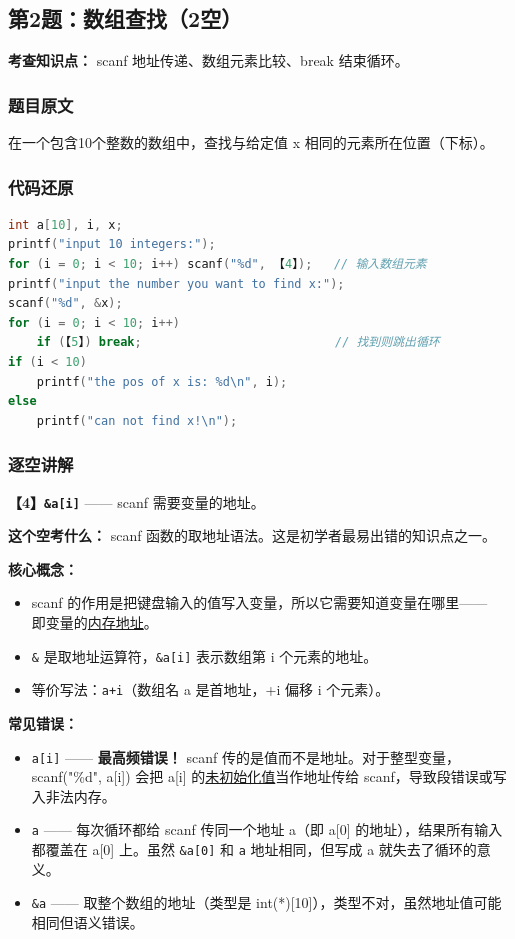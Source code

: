 \subsection{第2题：数组查找（2空）}

\textbf{考查知识点：} scanf 地址传递、数组元素比较、break 结束循环。

\subsubsection{题目原文}

在一个包含10个整数的数组中，查找与给定值 x 相同的元素所在位置（下标）。

\subsubsection{代码还原}

\begin{lstlisting}[language=C]
int a[10], i, x;
printf("input 10 integers:");
for (i = 0; i < 10; i++) scanf("%d", 【4】);   // 输入数组元素
printf("input the number you want to find x:");
scanf("%d", &x);
for (i = 0; i < 10; i++)
    if (【5】) break;                           // 找到则跳出循环
if (i < 10)
    printf("the pos of x is: %d\n", i);
else
    printf("can not find x!\n");
\end{lstlisting}

\subsubsection{逐空讲解}

\textbf{【4】\texttt{\&a[i]}} —— scanf 需要变量的地址。

\vspace{0.3em}
\textbf{这个空考什么：} scanf 函数的取地址语法。这是初学者最易出错的知识点之一。

\textbf{核心概念：}
\begin{itemize}
    \item scanf 的作用是把键盘输入的值写入变量，所以它需要知道变量在哪里——\\即变量的\underline{内存地址}。
    \item \texttt{\&} 是取地址运算符，\texttt{\&a[i]} 表示数组第 i 个元素的地址。
    \item 等价写法：\texttt{a+i}（数组名 a 是首地址，+i 偏移 i 个元素）。
\end{itemize}

\textbf{常见错误：}
\begin{itemize}
    \item \texttt{a[i]} —— \textbf{最高频错误！} scanf 传的是值而不是地址。对于整型变量，scanf("\%d", a[i]) 会把 a[i] 的\underline{未初始化值}当作地址传给 scanf，导致段错误或写入非法内存。
    \item \texttt{a} —— 每次循环都给 scanf 传同一个地址 a（即 a[0] 的地址），结果所有输入都覆盖在 a[0] 上。虽然 \texttt{\&a[0]} 和 \texttt{a} 地址相同，但写成 a 就失去了循环的意义。
    \item \texttt{\&a} —— 取整个数组的地址（类型是 int(*)[10]），类型不对，虽然地址值可能相同但语义错误。
\end{itemize}

